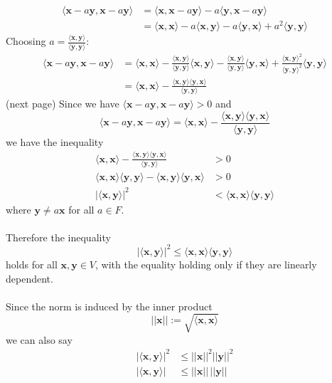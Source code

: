 \documentclass{report}
\begin{document}
\begin{align*}
\langle\bm{x}-a\bm{y},\bm{x}-a\bm{y}\rangle
&=\langle\bm{x},\bm{x}-a\bm{y}\rangle
-a\langle\bm{y},\bm{x}-a\bm{y}\rangle\\
&=\langle\bm{x},\bm{x}\rangle-a\langle\bm{x},\bm{y}\rangle
-a\langle\bm{y},\bm{x}\rangle
+a^2\langle\bm{y},\bm{y}\rangle
\end{align*}
Choosing $a=\frac{\langle\bm{x},\bm{y}\rangle}{\langle\bm{y},\bm{y}\rangle}$:
\begin{align*}
\langle\bm{x}-a\bm{y},\bm{x}-a\bm{y}\rangle
&=\langle\bm{x},\bm{x}\rangle-\frac{\langle\bm{x},\bm{y}\rangle}{\langle\bm{y},\bm{y}\rangle}\langle\bm{x},\bm{y}\rangle
-\frac{\langle\bm{x},\bm{y}\rangle}{\langle\bm{y},\bm{y}\rangle}\langle\bm{y},\bm{x}\rangle
+\frac{\langle\bm{x},\bm{y}\rangle^2}{\langle\bm{y},\bm{y}\rangle^2}\langle\bm{y},\bm{y}\rangle\\
&=\langle\bm{x},\bm{x}\rangle-\frac{\langle\bm{x},\bm{y}\rangle\langle\bm{y},\bm{x}\rangle}{\langle\bm{y},\bm{y}\rangle}
\end{align*}
(next page)
\newpage
\noindent Since we have $\langle\bm{x}-a\bm{y},\bm{x}-a\bm{y}\rangle>0$ and
\begin{equation*}
\langle\bm{x}-a\bm{y},\bm{x}-a\bm{y}\rangle=
\langle\bm{x},\bm{x}\rangle-
\frac{\langle\bm{x},\bm{y}\rangle\langle\bm{y},\bm{x}\rangle}{\langle\bm{y},\bm{y}\rangle}
\end{equation*}
we have the inequality 
\begin{align*}
\langle\bm{x},\bm{x}\rangle-
\frac{\langle\bm{x},\bm{y}\rangle\langle\bm{y},\bm{x}\rangle}{\langle\bm{y},\bm{y}\rangle}&>0\\
\langle\bm{x},\bm{x}\rangle\langle\bm{y},\bm{y}\rangle-
\langle\bm{x},\bm{y}\rangle\langle\bm{y},\bm{x}\rangle&>0\\
|\langle\bm{x},\bm{y}\rangle|^2&<\langle\bm{x},\bm{x}\rangle\langle\bm{y},\bm{y}\rangle
\end{align*}
where $\bm{y}\neq a\bm{x}$ for all $a\in F$.\\
\vspace{1mm}\\
Therefore the inequality 
\begin{equation*}
|\langle\bm{x},\bm{y}\rangle|^2\leq\langle\bm{x},\bm{x}\rangle\langle\bm{y},\bm{y}\rangle
\end{equation*}
holds for all $\bm{x},\bm{y}\in V$, with the equality holding only if they are linearly dependent.\\
\vspace{1mm}\\
Since the norm is induced by the inner product
\begin{equation*}
||\bm{x}||:=\sqrt{\langle\bm{x},\bm{x}\rangle}
\end{equation*}
we can also say
\begin{align*}
|\langle\bm{x},\bm{y}\rangle|^2&\leq||\bm{x}||^2||\bm{y}||^2\\
|\langle\bm{x},\bm{y}\rangle|&\leq||\bm{x}||\,||\bm{y}||
\end{align*}
\newpage
\end{document}
